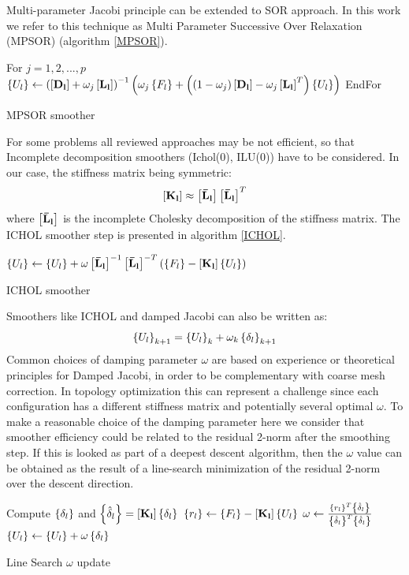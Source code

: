Multi-parameter Jacobi principle can be extended to SOR approach. In this work we refer to this technique as Multi Parameter Successive Over Relaxation (MPSOR) (algorithm \ref{MPSOR}).
 \clearpage
 \begin{algorithm} 
 For $j=1,2,...,p$\;
        $\left\lbrace{U_{l}}\right \rbrace\gets\left(\left[{\mathbf{D_{l}}}\right]+\omega_j\left[{\mathbf{L_{l}}}\right]\right)^{-1}\left(\omega_j\left\lbrace{F_{l}}\right \rbrace+\left((1-\omega_j)\left[{\mathbf{D_{l}}}\right]-\omega_j\left[{\mathbf{L_{l}}}\right]^T\right)\left\lbrace{U_{l}}\right \rbrace\right)$\;
        EndFor\;
        \caption{MPSOR smoother\label{MPSOR}}
 \end{algorithm}
 For some problems all reviewed approaches may be not efficient, so that Incomplete decomposition smoothers (Ichol(0), ILU(0)) have to be considered. In our case, the stiffness matrix being symmetric:
 \begin{equation}
 \left[{\mathbf{K_{l}}}\right]\approx \left[{\mathbf{\bar{L}_{l}}}\right]\left[{\mathbf{\bar{L}_{l}}}\right]^T
 \end{equation}
 where $\left[{\mathbf{\bar{L}_{l}}}\right]$ is the incomplete Cholesky decomposition of the stiffness matrix. 
 The ICHOL smoother step is presented in algorithm \ref{ICHOL}.
 \begin{algorithm} 
      $\left\lbrace{U_{l}}\right \rbrace\gets\left\lbrace{U_{l}}\right \rbrace+\omega\left[{\mathbf{\bar{L}_{l}}}\right]^{-1}{\left[{\mathbf{\bar{L}_{l}}}\right]}^{-T}\left(\left\lbrace{F_{l}}\right \rbrace-\left[{\mathbf{K_{l}}}\right]\left\lbrace{U_{l}}\right \rbrace\right)$\;
         \caption{ICHOL smoother\label{ICHOL}}
  \end{algorithm}
 Smoothers like ICHOL and damped Jacobi can also be written as:
 \begin{equation}
 \left\lbrace{U_{l}}\right \rbrace_{k+1}=\left\lbrace{U_{l}}\right \rbrace_{k}+\omega_k\left\lbrace{\delta_{l}}\right \rbrace_{k+1}
 \end{equation}
 Common choices of damping parameter $\omega$ are based on experience or theoretical principles for Damped Jacobi, in order to be complementary with coarse mesh correction. In topology optimization this can represent a challenge since each configuration has a different stiffness matrix and potentially several optimal $\omega$. To make a reasonable choice of the damping parameter here we consider that smoother efficiency could be related to the residual 2-norm after the smoothing step. If this is looked as part of a deepest descent algorithm, then the $\omega$ value can be obtained as the result of a line-search minimization of the residual 2-norm over the descent direction. 
  \begin{algorithm} 
  Compute $\left\lbrace{\delta_{l}}\right \rbrace$ and $\left\lbrace{\hat{\delta}_{l}}\right \rbrace=\left[{\mathbf{K_{l}}}\right]\left\lbrace{\delta_{l}}\right \rbrace$\;
  $\left\lbrace{r_{l}}\right \rbrace\gets\left\lbrace{F_{l}}\right \rbrace-\left[{\mathbf{K_{l}}}\right]\left\lbrace{U_{l}}\right \rbrace$\;
  	$\omega\gets\frac{\left\lbrace{r_{l}}\right \rbrace^T\left\lbrace{\hat{\delta}_{l}}\right \rbrace}{\left\lbrace{\hat{\delta}_{l}}\right \rbrace^T\left\lbrace{\hat{\delta}_{l}}\right \rbrace}$\;
       $\left\lbrace{U_{l}}\right \rbrace\gets\left\lbrace{U_{l}}\right \rbrace+\omega\left\lbrace{\delta_{l}}\right \rbrace$\;
          \caption{Line Search $\omega$ update\label{LS}}
   \end{algorithm}
